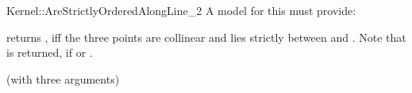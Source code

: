 \begin{ccRefFunctionObjectConcept}{Kernel::AreStrictlyOrderedAlongLine_2}
A model for this must provide:


          {returns , iff the three points are collinear and 
           lies strictly between  and .
          Note that  is returned, if  or
          .}

\ccRefines
{} (with three arguments)

\ccSeeAlso
{}  \\

\end{ccRefFunctionObjectConcept}         

